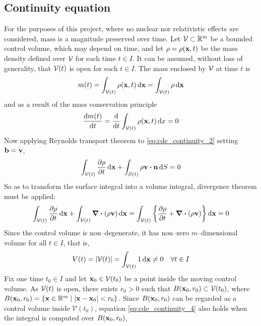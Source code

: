 
\subsection{Continuity equation}

For the purposes of this project, where no nuclear nor relativistic effects are considered, mass is a magnitude preserved over time. Let $\mathcal{V}_{} \subset \mathbb{R}^m$ be a bounded control volume, which may depend on time, and let $\rho = \rho(\vb{x}, t)$ be the mass density defined over $\mathcal{V}_{}$ for each time $t \in I$. It can be assumed, without loss of generality, that ${\mathcal{V}(t)}$ is open for each $t \in I$. The mass enclosed by $\mathcal{V}_{}$ at time $t$ is
\begin{equation}
	m(t) = \int_{\mathcal{V}(t)} \rho(\vb{x}, t) \dd{\vb{x}} = \int_{\mathcal{V}(t)} \rho \dd{\vb{x}}
\end{equation}
and as a result of the mass conservation principle
\begin{equation} \label{eq:cde_continuity_2}
	\frac{\dd m(t)}{\dd{t}} = 
	\frac{\dd}{\dd{t}} \int_{\mathcal{V}(t)} \rho(\vb{x}, t) \dd{x} = 0
\end{equation}
Now applying Reynolds transport theorem to \eqref{eq:cde_continuity_2} setting $\vb{b} = \vb{v}$,
\begin{equation}
	\int_\cvt \frac{\partial \rho}{\partial t} \dd{\vb{x}} + 
	\int_\cst \rho \vb{v} \vdot \vb{n} \dd{S} = 0
\end{equation}
So as to transform the surface integral into a volume integral, divergence theorem must be applied:
\begin{equation} \label{eq:cde_continuity_4}
	\int_{\mathcal{V}(t)} \frac{\partial \rho}{\partial t} \dd{\vb{x}} + 
	\int_{\mathcal{V}(t)} \div(\rho \vb{v}) \dd{\vb{x}} = 
	\int_{\mathcal{V}(t)} \left\{ \frac{\partial \rho}{\partial t} + \div(\rho \vb{v}) \right\} \dd{\vb{x}} = 0
\end{equation}
Since the control volume is non--degenerate, it has non--zero $m$--dimensional volume for all $t \in I$, that is,
\begin{equation}
	V(t) = \abs{{\mathcal{V}(t)}} = \int_{\mathcal{V}(t)} 1 \dd{\vb{x}} \neq 0 \quad \forall t \in I
\end{equation}
Fix one time $t_0 \in I$ and let $\vb{x}_0 \in \mathcal{V}(t_0)$ be a point inside the moving control volume. As ${\mathcal{V}(t)}$ is open, there exists $r_0 > 0$ such that $B(\vb{x}_0, r_0) \subset \mathcal{V}(t_0)$, where $B(\vb{x}_0, r_0) = \{ \vb{x} \in \mathbb{R}^m \mid \abs{\vb{x} - \vb{x}_0} < r_0 \}$. Since $B(\vb{x}_0, r_0)$ can be regarded as a control volume inside $\mathcal{V}(t_0)$, equation \eqref{eq:cde_continuity_4} also holds when the integral is computed over $B(\vb{x}_0, r_0)$, \ie
